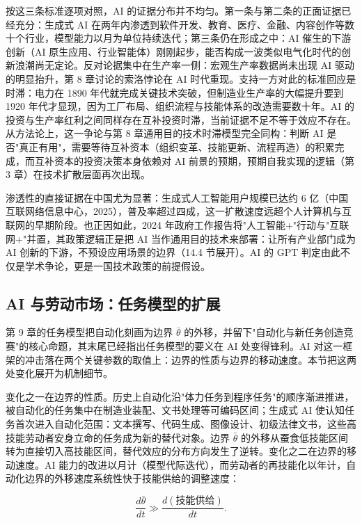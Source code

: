 按这三条标准逐项对照，AI 的证据分布并不均匀。第一条与第二条的正面证据已经充分：生成式 AI 在两年内渗透到软件开发、教育、医疗、金融、内容创作等数十个行业，模型能力以月为单位持续迭代；第三条仍在形成之中：AI 催生的下游创新（AI 原生应用、行业智能体）刚刚起步，能否构成一波类似电气化时代的创新浪潮尚无定论。反对论据集中在生产率一侧：宏观生产率数据尚未出现 AI 驱动的明显抬升，第 8 章讨论的索洛悖论在 AI 时代重现。支持一方对此的标准回应是时滞：电力在 1890 年代就完成关键技术突破，但制造业生产率的大幅提升要到 1920 年代才显现，因为工厂布局、组织流程与技能体系的改造需要数十年。AI 的投资与生产率红利之间同样存在互补投资时滞，当前证据不足不等于效应不存在。从方法论上，这一争论与第 8 章通用目的技术时滞模型完全同构：判断 AI 是否"真正有用"，需要等待互补资本（组织变革、技能更新、流程再造）的积累完成，而互补资本的投资决策本身依赖对 AI 前景的预期，预期自我实现的逻辑（第 3 章）在技术扩散层面再次出现。

渗透性的直接证据在中国尤为显著：生成式人工智能用户规模已达约 6 亿（中国互联网络信息中心，2025），普及率超过四成，这一扩散速度远超个人计算机与互联网的早期阶段。也正因如此，2024 年政府工作报告将"人工智能+"行动与"互联网+"并置，其政策逻辑正是把 AI 当作通用目的技术来部署：让所有产业部门成为 AI 创新的下游，不预设应用场景的边界（14.4 节展开）。AI 的 GPT 判定由此不仅是学术争论，更是一国技术政策的前提假设。

\subsection{AI 与劳动市场：任务模型的扩展}

第 9 章的任务模型把自动化刻画为边界 $\bar\theta$ 的外移，并留下"自动化与新任务创造竞赛"的核心命题，其末尾已经指出任务模型的要义在 AI 处变得锋利。AI 对这一框架的冲击落在两个关键参数的取值上：边界的性质与边界的移动速度。本节把这两处变化展开为机制细节。

变化之一在边界的性质。历史上自动化沿"体力任务到程序任务"的顺序渐进推进，被自动化的任务集中在制造业装配、文书处理等可编码区间；生成式 AI 使认知任务首次进入自动化范围：文本撰写、代码生成、图像设计、初级法律文书，这些高技能劳动者安身立命的任务成为新的替代对象。边界 $\bar\theta$ 的外移从蚕食低技能区间转为直接切入高技能区间，替代效应的分布方向发生了逆转。变化之二在边界的移动速度。AI 能力的改进以月计（模型代际迭代），而劳动者的再技能化以年计，自动化边界的外移速度系统性快于技能供给的调整速度：

\[
\frac{d\bar\theta}{dt} \gg \frac{d(\text{技能供给})}{dt}.
\]

